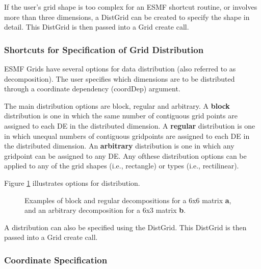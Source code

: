 If the user's grid shape is too complex for an ESMF shortcut routine,
or involves more than three dimensions, a DistGrid can be created
to specify the shape in detail.  This DistGrid is then passed
into a Grid create call.

\subsubsection{Shortcuts for Specification of Grid Distribution}\label{sec:desc:dist}

ESMF Grids have several options for data distribution (also referred to
as decomposition).  The user specifies which dimensions 
are to be distributed through a coordinate dependency (coordDep)
argument.

The main distribution options are block, regular and arbitrary.
A {\bf block} distribution is one in which the same number of
contiguous grid points are assigned to each DE in the
distributed dimension.  A {\bf regular} distribution is one in which
unequal numbers of contiguous gridpoints are assigned to each
DE in the distributed dimension.  An {\bf arbitrary} distribution is
one in which any gridpoint can be assigned to any DE.  Any ofthese
distribution options can be applied to any of the grid shapes (i.e.,
rectangle) or types (i.e., rectilinear).

Figure \ref{fig:GridDecomps} illustrates options for distribution.
\begin{figure}
\caption{Examples of block and regular decompositions for
a 6x6 matrix {\bf a}, and an arbitrary decomposition for a 6x3 matrix {\bf b}.}
\label{fig:GridDecomps}
\end{figure}

A distribution can also be specified using the DistGrid.  This
DistGrid is then passed into a Grid create call.

\subsubsection{Coordinate Specification}

